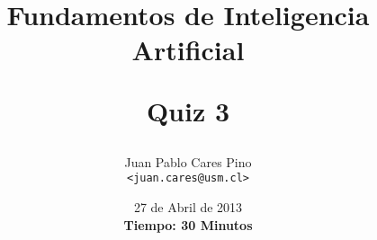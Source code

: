 \documentclass[letter, 10pt]{article}
\begin{document}
\title{Fundamentos de Inteligencia Artificial \\ \begin{Large}Quiz 3\end{Large}}
\author{Juan Pablo Cares Pino \\ \texttt{<juan.cares@usm.cl>}}
\date{ 27 de Abril de 2013 \\
\textbf{Tiempo: 30 Minutos}}


\end{document}
